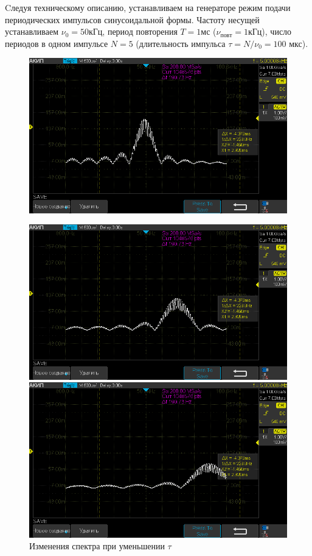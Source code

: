 \documentclass[12pt,a4paper]{article}
\begin{document}
Cледуя техническому описанию, устанавливаем на генераторе режим
подачи периодических импульсов синусоидальной формы. Частоту несущей
устанавливаем $\nu_0 = 50 \text{кГц}$, период повторения $T = 1 \text{мс}$ ($\nu_{повт} = 1 \text{кГц}$), число периодов в одном импульсе $N = 5$ (длительность импульса $\tau = N/\nu_{0} = 100$ мкс).


\begin{figure}[H]
	\centering
	\begin{minipage}[b]{.33\textwidth}
		\centering
		\includegraphics[width=0.9\linewidth]{"photo/zug1"}
		\label{photo:zug}
		\caption{Изменения спектра при уменьшении $\tau$}
	\end{minipage}%
	\begin{minipage}[b]{.33\textwidth}
		\centering
		\includegraphics[width=0.9\linewidth]{"photo/zug2"}
	\end{minipage}%
	\begin{minipage}[b]{.33\textwidth}
		\centering
		\includegraphics[width=0.9\linewidth]{"photo/zug3"}
	\end{minipage}
\end{figure}
\end{document}
